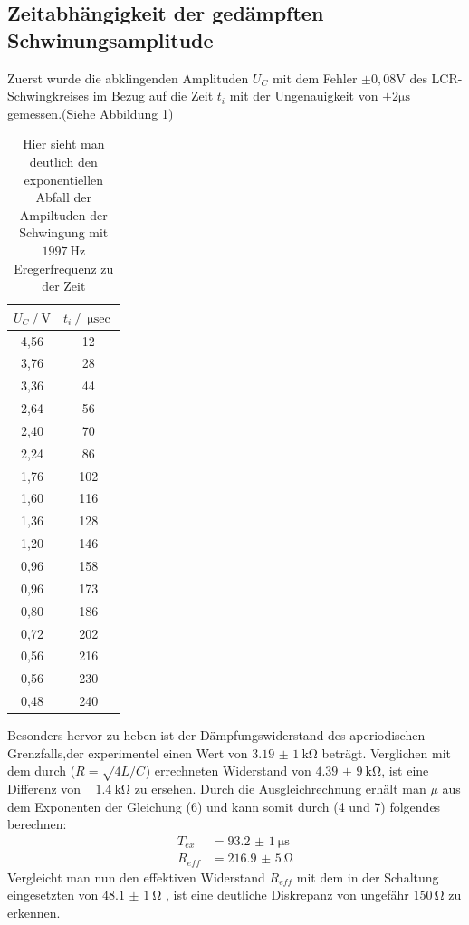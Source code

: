 \subsection[underline]{Zeitabhängigkeit der gedämpften Schwinungsamplitude}
Zuerst wurde die abklingenden Amplituden $U_C$ mit dem Fehler $\pm{0,08}$$\si{\volt}$ des LCR-Schwingkreises im Bezug auf
die Zeit $t_i$ mit der Ungenauigkeit von $\pm{2}$$\si{\micro\s}$ gemessen.(Siehe Abbildung 1)
\begin{table}
  \centering
  \caption{Hier sieht man deutlich den exponentiellen Abfall der Ampiltuden der Schwingung mit $\SI{1997}{\hertz}$ Eregerfrequenz zu der Zeit}
  \label{tab:Daten1}
  \begin{tabular}{S S}
   \toprule
   {$U_C\:/\:\si{\volt}$} & {$t_i\:/\:\si{\micro\sec}$} \\
   ,56 & 12\\
  3,76 & 28\\
  3,36 & 44\\
  2,64 & 56\\
  2,40 & 70\\
  2,24 & 86\\
  1,76 & 102\\
  1,60 & 116\\
  1,36 & 128\\
  1,20 & 146\\
  0,96 & 158\\
  0,96 & 173\\
  0,80 & 186\\
  0,72 & 202\\
  0,56 & 216\\
  0,56 & 230\\
  0,48 & 240\\
   \bottomrule
  \end{tabular}
 \end{table}
Besonders hervor zu heben ist der Dämpfungswiderstand des aperiodischen Grenzfalls,der experimentel einen Wert von $\SI{3,19(1)}{\kilo\ohm}$ beträgt.
Verglichen mit dem durch ($ R = \sqrt{4L/C}$) errechneten Widerstand von $\SI{4,39(9)}{\kilo\ohm}$, ist eine Differenz von ~ $\SI{1,4}{\kilo\ohm}$ zu ersehen.
Durch die Ausgleichrechnung erhält man $\mu$ aus dem Exponenten der Gleichung (6) und kann somit durch (4 und 7) folgendes berechnen:
\begin{align*}
 T_{ex} &= \SI{93,2(1)}{\micro\s}\\
 R_{eff} &= \SI{216,9(5)}{\ohm}
\end{align*}
Vergleicht man nun den effektiven Widerstand $R_{eff}$ mit dem in der Schaltung eingesetzten von $\SI{48,1(1)}{\ohm}$ , ist eine deutliche Diskrepanz von ungefähr $\SI{150}{\ohm}$ zu erkennen.
